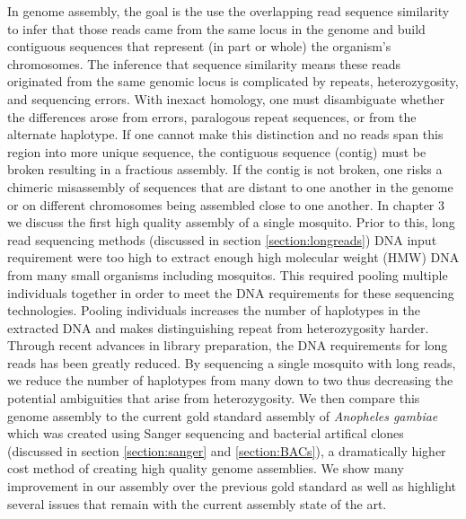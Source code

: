 \par{
In genome assembly, the goal is the use the overlapping read sequence similarity to infer that those reads came from the same locus in the genome and build contiguous sequences that represent (in part or whole) the organism's chromosomes. The inference that sequence similarity means these reads originated from the same genomic locus is complicated by repeats, heterozygosity, and sequencing errors. With inexact homology, one must disambiguate whether the differences arose from errors, paralogous repeat sequences, or from the alternate haplotype. If one cannot make this distinction and no reads span this region into more unique sequence, the contiguous sequence (contig) must be broken resulting in a fractious assembly. If the contig is not broken, one risks a chimeric misassembly of sequences that are distant to one another in the genome or on different chromosomes being assembled close to one another. In chapter 3 we discuss the first high quality assembly of a single mosquito. Prior to this, long read sequencing methods (discussed in section \ref{section:longreads}) DNA input requirement were too high to extract enough high molecular weight (HMW) DNA from many small organisms including mosquitos. This required pooling multiple individuals together in order to meet the DNA requirements for these sequencing technologies. Pooling individuals increases the number of haplotypes in the extracted DNA and makes distinguishing repeat from heterozygosity harder. Through recent advances in library preparation, the DNA requirements for long reads has been greatly reduced. By sequencing a single mosquito with long reads, we reduce the number of haplotypes from many down to two thus decreasing the potential ambiguities that arise from heterozygosity. We then compare this genome assembly to the current gold standard assembly of \textit{Anopheles gambiae} which was created using Sanger sequencing and bacterial artifical clones (discussed in section \ref{section:sanger} and \ref{section:BACs}), a dramatically higher cost method of creating high quality genome assemblies. We show many improvement in our assembly over the previous gold standard as well as highlight several issues that remain with the current assembly state of the art.
} \\



